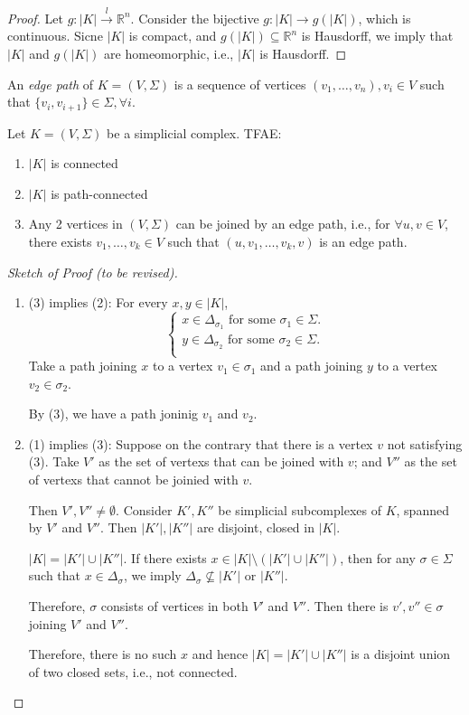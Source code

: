 \begin{proof}
Let $g:|K|\xrightarrow{l}\mathbb{R}^n$.
Consider the bijective $g:|K|\to g(|K|)$, which is continuous.
Sicne $|K|$ is compact, and $g(|K|)\subseteq \mathbb{R}^n$ is Hausdorff, we imply that $|K|$ and $g(|K|)$ are homeomorphic, i.e., $|K|$ is Hausdorff.
\end{proof}

\begin{definition}
An \emph{edge path} of $K=(V,\Sigma)$ is a sequence of vertices $(v_1,\dots,v_n), v_i\in V$ such that $\{v_i,v_{i+1}\}\in\Sigma,\forall i$.
\end{definition}

\begin{proposition}[Connectedness]
Let $K=(V,\Sigma)$ be a simplicial complex. TFAE:
\begin{enumerate}
\item
$|K|$ is connected
\item
$|K|$ is path-connected
\item
Any 2 vertices in $(V,\Sigma)$ can be joined by an edge path, i.e., for $\forall u,v\in V$, there exists $v_1,\dots,v_k\in V$ such that $(u,v_1,\dots,v_k,v)$ is an edge path.
\end{enumerate}
\end{proposition}

\begin{proof}[Sketch of Proof (to be revised)]
\begin{enumerate}
\item
(3) implies (2):
For every $x,y\in|K|$, 
\[
\left\{
\begin{aligned}
x\in\Delta_{\sigma_1}\text{ for some $\sigma_1\in\Sigma$.}\\
y\in\Delta_{\sigma_2}\text{ for some $\sigma_2\in\Sigma$.}\\
\end{aligned}
\right.
\]
Take a path joining $x$ to a vertex $v_1\in\sigma_1$ and a path joining $y$ to a vertex $v_2\in\sigma_2$.

By (3), we have a path joninig $v_1$ and $v_2$.
\item
(1) implies (3):
Suppose on the contrary that there is a vertex $v$ not satisfying (3).
Take $V'$ as the set of vertexs that can be joined with $v$; and $V''$ as the set of vertexs that cannot be joinied with $v$.

Then $V',V''\ne\emptyset$.
Consider $K',K''$ be simplicial subcomplexes of $K$, spanned by $V'$ and $V''$.
Then $|K'|,|K''|$ are disjoint, closed in $|K|$.

$|K| = |K'|\cup|K''|$. 
If there exists $x\in |K|\setminus(|K'|\cup|K''|)$, then for any $\sigma\in\Sigma$ such that $x\in\Delta_{\sigma}$, we imply $\Delta_\sigma\not\subseteq |K'|$ or $|K''|$.

Therefore, $\sigma$ consists of vertices in both $V'$ and $V''$.
Then there is $v',v''\in\sigma$ joining $V'$ and $V''$.

Therefore, there is no such $x$ and hence $|K|=|K'|\cup|K''|$ is a disjoint union of two closed sets, i.e., not connected.
\end{enumerate}
\end{proof}

